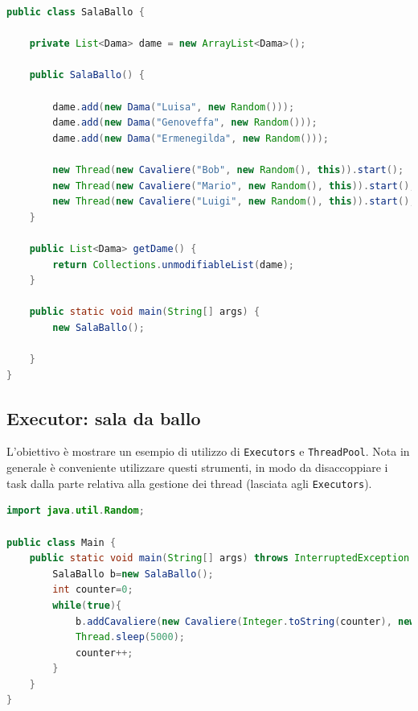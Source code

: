 \documentclass{article}
\begin{document}
\begin{lstlisting}[language=Java]
public class SalaBallo {

	private List<Dama> dame = new ArrayList<Dama>();

	public SalaBallo() {
		
		dame.add(new Dama("Luisa", new Random()));
		dame.add(new Dama("Genoveffa", new Random()));
		dame.add(new Dama("Ermenegilda", new Random()));
		
		new Thread(new Cavaliere("Bob", new Random(), this)).start();
		new Thread(new Cavaliere("Mario", new Random(), this)).start();
		new Thread(new Cavaliere("Luigi", new Random(), this)).start();
	}

	public List<Dama> getDame() {
		return Collections.unmodifiableList(dame);
	}

	public static void main(String[] args) {
		new SalaBallo();

	}
}
\end{lstlisting}

\subsection{Executor: sala da ballo}

L'obiettivo \`e mostrare un esempio di utilizzo di \texttt{Executors} e \texttt{ThreadPool}. Nota in generale \`e conveniente utilizzare questi strumenti, in modo da disaccoppiare i task dalla parte relativa alla gestione dei thread (lasciata agli  \texttt{Executors}).

\begin{lstlisting}[language=Java]
import java.util.Random;

public class Main {
	public static void main(String[] args) throws InterruptedException {
		SalaBallo b=new SalaBallo();
		int counter=0;
		while(true){
			b.addCavaliere(new Cavaliere(Integer.toString(counter), new Random(), b));
			Thread.sleep(5000);
			counter++;
		}
	}
}
\end{lstlisting}
\end{document}
